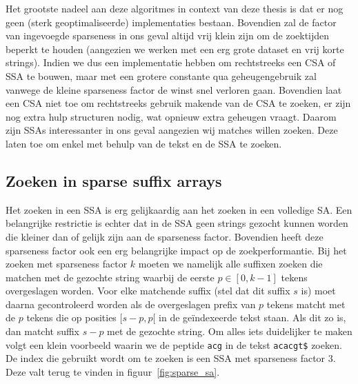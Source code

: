 Het grootste nadeel aan deze algoritmes in context van deze thesis is dat er nog geen (sterk geoptimaliseerde) implementaties bestaan.
Bovendien zal de factor van ingevoegde sparseness in ons geval altijd vrij klein zijn om de zoektijden beperkt te houden (aangezien we werken met een erg grote dataset en vrij korte strings).
Indien we dus een implementatie hebben om rechtstreeks een CSA of SSA te bouwen, maar met een grotere constante qua geheugengebruik zal vanwege de kleine sparseness factor de winst snel verloren gaan.
Bovendien laat een CSA niet toe om rechtstreeks gebruik makende van de CSA te zoeken, er zijn nog extra hulp structuren nodig, wat opnieuw extra geheugen vraagt. %
Daarom zijn SSAs interessanter in ons geval aangezien wij matches willen zoeken.
Deze laten toe om enkel met behulp van de tekst en de SSA te zoeken.

\subsection{Zoeken in sparse suffix arrays}\label{subsec:zoeken-in-sparse-suffix-arrays}
Het zoeken in een SSA is erg gelijkaardig aan het zoeken in een volledige SA\@.
Een belangrijke restrictie is echter dat in de SSA geen strings gezocht kunnen worden die kleiner dan of gelijk zijn aan de sparseness factor.
Bovendien heeft deze sparseness factor ook een erg belangrijke impact op de zoekperformantie.
Bij het zoeken met sparseness factor $k$ moeten we namelijk alle suffixen zoeken die matchen met de gezochte string waarbij de eerste $p \in [0, k-1]$ tekens overgeslagen worden.
Voor elke matchende suffix (stel dat dit suffix $s$ is) moet daarna gecontroleerd worden als de overgeslagen prefix van $p$ tekens matcht met de $p$ tekens die op posities $[s - p, p[$ in de geïndexeerde tekst staan.
Als dit zo is, dan matcht suffix $s - p$ met de gezochte string.
Om alles iets duidelijker te maken volgt een klein voorbeeld waarin we de peptide \texttt{acg} in de tekst \texttt{acacgt\$} zoeken.
De index die gebruikt wordt om te zoeken is een SSA met sparseness factor 3.
Deze valt terug te vinden in figuur~\ref{fig:sparse_sa}.

